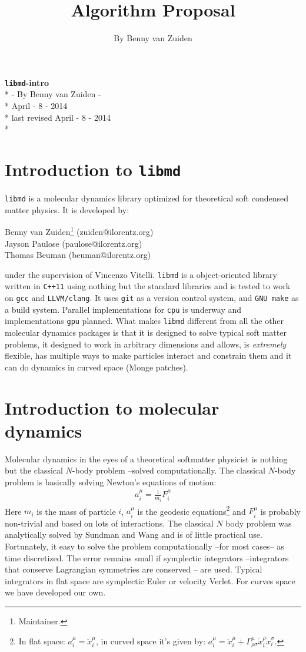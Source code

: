 \documentclass[11pt,a4paper,oneside]{report}
\newcommand{\sect}[1]{\section{#1}  \setcounter{equation}{0}}
\newcommand{\cs}[3]{\Gamma^{#3}_{#1 #2}}
\begin{document}
\title{Algorithm Proposal}
\author{By Benny van Zuiden} 

\begin{center}
{\textbf{\Large{\texttt{libmd}-intro}} \\*
\large{- By Benny van Zuiden -} \\*
{April - 8 - 2014} \\* {\vspace{4pt}}
\tiny{last revised April - 8 - 2014} \\* \vspace{10pt}}
\end{center}
\normalsize
\sect{Introduction to \texttt{libmd}}
\texttt{libmd} is a molecular dynamics library optimized for theoretical soft condensed matter physics. It is developed by:
\begin{center}
Benny van Zuiden\footnote{Maintainer.} (zuiden@ilorentz.org) \\
Jayson Paulose (paulose@ilorentz.org) \\
Thomas Beuman (beuman@ilorentz.org)
\end{center}
under the supervision of Vincenzo Vitelli. \texttt{libmd} is a object-oriented library written in \texttt{C++11} using nothing but the standard libraries and is tested to work on \texttt{gcc} and \texttt{LLVM/clang}. It uses \texttt{git} as a version control system, and \texttt{GNU make} as a build system. Parallel implementations for \texttt{cpu} is underway and implementations \texttt{gpu} planned. What makes \texttt{libmd} different from all the other molecular dynamics packages is that it is designed to solve typical soft matter problems, it designed to work in arbitrary dimensions and allows, is \emph{extremely} flexible, has multiple ways to make particles interact and constrain them and it can do dynamics in curved space (Monge patches).  
\sect{Introduction to molecular dynamics}
Molecular dynamics in the eyes of a theoretical softmatter physicist is nothing but the classical $N$-body problem --solved computationally. The classical $N$-body problem is basically solving Newton's equations of motion:
\begin{align}
a^{\mu}_i = \frac{1}{m_i} F^{\mu}_i
\end{align} 
Here $m_i$ is the mass of particle $i$, $a^{\mu}_i$ is the geodesic equations\footnote{In flat space: $a^{\mu}_i = \ddot{x}^{\mu}_i$, in curved space it's given by: $a^{\mu}_i = \ddot{x}^{\mu}_i+\cs{\rho}{\sigma}{\mu} \dot{x}^{\rho}_i \dot{x}^{\sigma}_i$.} and $F^{\mu}_i$ is probably non-trivial and based on lots of interactions. The classical $N$ body problem was analytically solved by Sundman and Wang and is of little practical use. Fortunately, it easy to solve the problem computationally --for most cases-- as time discretized. The error remains small if symplectic integrators --integrators that conserve Lagrangian symmetries are conserved -- are used. Typical integrators in flat space are symplectic Euler or velocity Verlet. For curves space we have developed our own.
\end{document}
